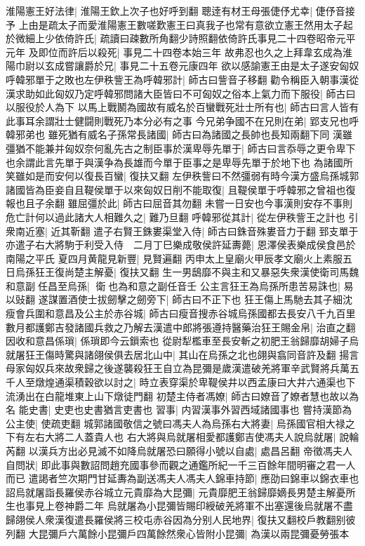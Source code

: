 淮陽憲王好法律|{
	淮陽王欽上次子也好呼到翻}
聰逹有材王母張倢伃尤幸|{
	倢伃音接予}
上由是疏太子而愛淮陽憲王數嗟歎憲王曰真我子也常有意欲立憲王然用太子起於微細上少依倚許氏|{
	疏讀曰疎數所角翻少詩照翻依倚許氏事見二十四卷昭帝元平元年}
及即位而許后以殺死|{
	事見二十四卷本始三年}
故弗忍也久之上拜韋玄成為淮陽巾尉以玄成嘗讓爵於兄|{
	事見二十五卷元康四年}
欲以感諭憲王由是太子遂安匈奴呼韓邪單于之敗也左伊秩訾王為呼韓邪計|{
	師古曰訾音子移翻}
勸令稱臣入朝事漢從漢求助如此匈奴乃定呼韓邪問諸大臣皆曰不可匈奴之俗本上氣力而下服役|{
	師古曰以服役於人為下}
以馬上戰鬭為國故有威名於百蠻戰死壯士所有也|{
	師古曰言人皆有此事耳余謂壯士健闘則戰死乃本分必有之事}
今兄弟争國不在兄則在弟|{
	郢支兄也呼韓邪弟也}
雖死猶有威名子孫常長諸國|{
	師古曰為諸國之長帥也長知兩翻下同}
漢雖彊猶不能兼并匈奴奈何亂先古之制臣事於漢卑辱先單于|{
	師古曰言忝辱之更令卑下也余謂此言先單于與漢争為長雄而今單于臣事之是卑辱先單于於地下也}
為諸國所笑雖如是而安何以復長百蠻|{
	復扶又翻}
左伊秩訾曰不然彊弱有時今漢方盛烏孫城郭諸國皆為臣妾自且鞮侯單于以來匈奴日削不能取復|{
	且鞮侯單于呼韓邪之曾祖也復報也且子余翻}
雖屈彊於此|{
	師古曰屈音其勿翻}
未嘗一日安也今事漢則安存不事則危亡計何以過此諸大人相難久之|{
	難乃旦翻}
呼韓邪從其計|{
	從左伊秩訾王之計也}
引衆南近塞|{
	近其靳翻}
遣子右賢王銖婁渠堂入侍|{
	師古曰銖音殊婁音力于翻}
郅支單于亦遣子右大將駒于利受入侍　二月丁巳樂成敬侯許延夀薨|{
	恩澤侯表樂成侯食邑於南陽之平氏}
夏四月黄龍見新豐|{
	見賢遍翻}
丙申太上皇廟火甲辰孝文廟火上素服五日烏孫狂王復尚楚主解憂|{
	復扶又翻}
生一男鴟靡不與主和又暴惡失衆漢使衛司馬魏和意副任昌至烏孫|{
	衛也為和意之副任音壬}
公主言狂王為烏孫所患苦易誅也|{
	易以䜴翻}
遂謀置酒使士拔劒擊之劒旁下|{
	師古曰不正下也}
狂王傷上馬馳去其子細沈瘦會兵圍和意昌及公主於赤谷城|{
	師古曰瘦音搜赤谷城烏孫國都去長安八千九百里}
數月都護鄭吉發諸國兵救之乃解去漢遣中郎將張遵持醫藥治狂王賜金帛|{
	治直之翻}
因收和意昌係瑣|{
	係瑣即今云鎻索也}
從尉犁檻車至長安斬之初肥王翁歸靡胡婦子烏就屠狂王傷時驚與諸翖侯俱去居北山中|{
	其山在烏孫之北也翖與翕同音許及翻}
揚言母家匈奴兵來故衆歸之後遂襲殺狂王自立為昆彌是歲漢遣破羌將軍辛武賢將兵萬五千人至燉煌通渠積穀欲以討之|{
	時立表穿渠於卑鞮侯井以西孟康曰大井六通渠也下流湧出在白龍堆東上山下燉徒門翻}
初楚主侍者馮嫽|{
	師古曰嫽音了嫽者慧也故以為名}
能史書|{
	史吏也史書猶言吏書也}
習事|{
	内習漢事外習西域諸國事也}
嘗持漢節為公主使|{
	使疏吏翻}
城郭諸國敬信之號曰馮夫人為烏孫右大將妻|{
	烏孫國官相大禄之下有左右大將二人蓋貴人也}
右大將與烏就屠相愛都護鄭吉使馮夫人說烏就屠|{
	說輪芮翻}
以漢兵方出必見滅不如降烏就屠恐曰願得小號以自處|{
	處昌呂翻}
帝徵馮夫人自問狀|{
	即此事與數詔問趙充國事參而觀之通鑑所紀一千三百餘年間明審之君一人而已}
遣謁者竺次期門甘延夀為副送馮夫人馮夫人錦車持節|{
	應劭曰錦車以錦衣車也}
詔烏就屠詣長羅侯赤谷城立元貴靡為大昆彌|{
	元貴靡肥王翁歸靡嫡長男楚主解憂所生也事見上卷神爵二年}
烏就屠為小昆彌皆賜印綬破羌將軍不出塞還後烏就屠不盡歸翖侯人衆漢復遣長羅侯將三校屯赤谷因為分别人民地界|{
	復扶又翻校戶教翻别彼列翻}
大昆彌戶六萬餘小昆彌戶四萬餘然衆心皆附小昆彌|{
	為漢以兩昆彌憂勞張本}


